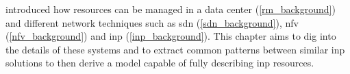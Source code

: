  introduced how resources can be managed in a data center (\autoref{rm_background}) and different network techniques such as \gls{sdn} (\autoref{sdn_background}), \gls{nfv} (\autoref{nfv_background}) and \gls{inp} (\autoref{inp_background}).
This chapter aims to dig into the details of these systems and to extract common patterns between similar \gls{inp} solutions to then derive a model capable of fully describing \gls{inp} resources.